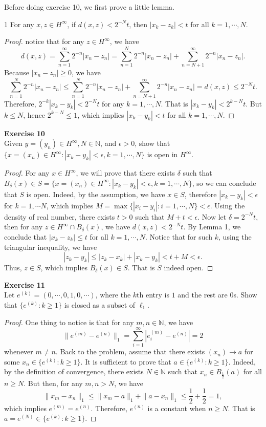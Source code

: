\documentclass[12pt, a4paper]{article}
\theoremstyle{plain}
\newcommand{\N}{\mathbb{N}}
\newenvironment{exercise}[2][Exercise]
    { \begin{mdframed}[backgroundcolor=gray!20] \textbf{#1 #2} \\}
    {  \end{mdframed}}
\begin{document}
Before doing exercise 10, we first prove a little lemma.
	\begin{lemma}1
	For any $x,z\in H^\infty$, if $d(x,z)<2^{-N}t$, then $|x_k-z_k|<t$ for all $k=1,\cdots,N$.
	\end{lemma}
		\begin{proof}
		notice that for any $z\in H^\infty$, we have
	\[
	d(x,z)=\sum_{n=1}^{\infty}{2^{-n}|x_n-z_n|}=\sum_{n=1}^{N}{2^{-n}|x_n-z_n|}+\sum_{n=N+1}^{\infty}{2^{-n}|x_n-z_n|}.
	\]
	Because $|x_n-z_n|\geq 0$, we have
	\[
	\sum_{n=1}^{N}{2^{-n}|x_n-z_n|}\leq \sum_{n=1}^{N}{2^{-n}|x_n-z_n|}+\sum_{n=N+1}^{\infty}{2^{-n}|x_n-z_n|}=d(x,z)\leq 2^{-N}t.
	\]
	Therefore, $2^{-k}|x_k-y_k|<2^{-N}t$ for any $k=1,\cdots,N$. That is $|x_k-y_k|<2^{k-N}t$. But $k\leq N$, hence $2^{k-N}\leq 1$, which implies $|x_k-y_k|<t$ for all $k=1,\cdots,N$.
		\end{proof}
\begin{exercise}{10}
Given $y=(y_n)\in H^\infty,N\in\N$, and $\epsilon >0$, show that $\{x=(x_n)\in H^\infty:|x_k-y_k|<\epsilon ,k=1,\cdots ,N\}$ is open in $H^\infty$.
\end{exercise}
	
	\begin{proof}
	For any $x\in H^\infty$, we will prove that there exists $\delta$ such that $B_\delta(x)\in S=\{x=(x_n)\in H^\infty:|x_k-y_k|<\epsilon, k=1,\cdots ,N\}$, so we can conclude that $S$ is open. Indeed, by the assumption, we have $x\in S$, therefore $|x_k-y_k|<\epsilon$ for $k=1,\cdots N$, which implies $M=\max\{|x_i-y_i|:i=1,\cdots,N\}<\epsilon$. Using the density of real number, there exists $t>0$ such that $M+t<\epsilon$. Now let $\delta=2^{-N}t$, then for any $z\in H^\infty\cap B_\delta(x)$, we have $d(x,z)<2^{-N}t$. By Lemma 1, we conclude that $|x_k-z_k|\leq t$ for all $k=1,\cdots,N$. Notice that for such $k$, using the triangular inequality, we have
	\[
	|z_k-y_k|\leq |z_k-x_k|+|x_k-y_k|<t+M<\epsilon.
	\]
	Thus, $z\in S$, which implies $B_\delta(x)\in S$. That is $S$ indeed open.
	\end{proof}

\begin{exercise}{11}
Let $e^{(k)}=(0,\cdots,0,1,0,\cdots)$, where the $k$th entry is $1$ and the rest are $0$s. Show that $\{e^{(k)}:k\geq 1\}$ is closed as a subset of $\ell_1$.
\end{exercise}
	\begin{proof}
	One thing to notice is that for any $m,n\in \N$, we have 
	\[
	\|e^{(m)}-e^{(n)}\|_1=\sum_{i=1}^{\infty}{|e^{(m)}_i-e^{(n)}|}=2
	\]
	whenever $m\neq n$. Back to the problem, assume that there exists $(x_n)\rightarrow a$ for some $x_n\in \{e^{(k)}:k\geq 1\}$. It is sufficient to prove that $a\in \{e^{(k)}:k\geq 1\}$. Indeed, by the definition of convergence, there exists $N\in\N$ such that $x_n\in B_{\frac{1}{2}}(a)$ for all $n\geq N$. But then, for any $m,n>N$, we have 
	\[
	\|x_m-x_n\|_1\leq \|x_m-a\|_1+\|a-x_n\|_1\leq \frac{1}{2}+\frac{1}{2}=1,
	\]
	which implies $e^{(m)}=e^{(n)}$. Therefore, $e^{(n)}$ is a constant when $n\geq N$. That is $a=e^{(N)}\in \{e^{(k)}:k\geq 1\}$.
	\end{proof}
\end{document}
